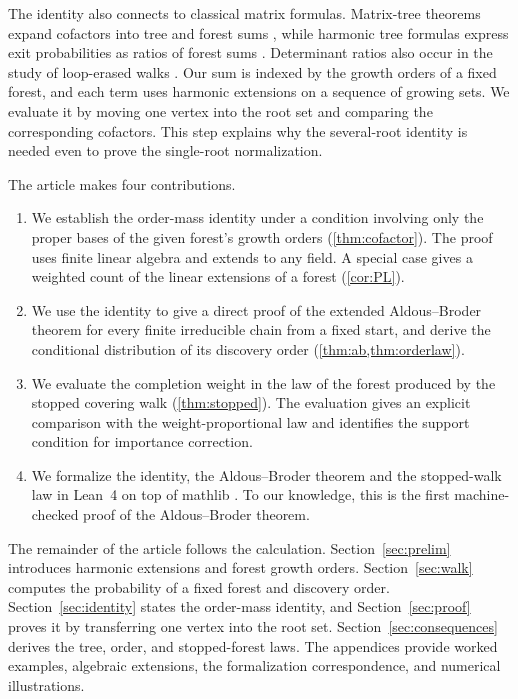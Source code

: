 \documentclass[onefignum,onetabnum,nohypdvips]{siamart250211}
\numberwithin{theorem}{section}
\numberwithin{equation}{section}
\begin{document}
The identity also connects to classical matrix formulas. Matrix-tree
theorems expand cofactors into tree and forest sums
\cite{Tutte1948,Chaiken1982}, while harmonic tree formulas express exit
probabilities as ratios of forest sums \cite{PitmanTang2018}.
Determinant ratios also occur in the study of loop-erased walks
\cite{Marchal2000,Fomin2001}. Our sum is indexed by the growth orders
of a fixed forest, and each term uses harmonic extensions on a
sequence of growing sets. We evaluate it by moving one vertex into
the root set and comparing the corresponding cofactors. This step
explains why the several-root identity is needed even to prove the
single-root normalization.

The article makes four contributions.
\begin{enumerate}
\item We establish the order-mass identity under a condition involving
only the proper bases of the given forest's growth orders
(\cref{thm:cofactor}). The proof uses finite linear algebra and extends
to any field. A special case gives a weighted count of the linear
extensions of a forest (\cref{cor:PL}).
\item We use the identity to give a direct proof of the extended
Aldous--Broder theorem for every finite irreducible chain from a fixed
start, and derive the conditional distribution of its discovery
order (\cref{thm:ab,thm:orderlaw}).
\item We evaluate the completion weight in the law of the forest
produced by the stopped covering walk (\cref{thm:stopped}). The
evaluation gives an explicit comparison with the weight-proportional
law and identifies the support condition for importance correction.
\item We formalize the identity, the Aldous--Broder theorem and the
stopped-walk law in Lean~4 \cite{deMouraUllrich2021} on top of mathlib
\cite{mathlib2020}. To our knowledge, this is the first machine-checked
proof of the Aldous--Broder theorem.
\end{enumerate}

The remainder of the article follows the calculation.
Section~\ref{sec:prelim} introduces harmonic extensions and forest
growth orders. Section~\ref{sec:walk} computes the probability of a
fixed forest and discovery order. Section~\ref{sec:identity} states
the order-mass identity, and Section~\ref{sec:proof} proves it by
transferring one vertex into the root set.
Section~\ref{sec:consequences} derives the tree, order, and
stopped-forest laws. The appendices provide worked examples, algebraic
extensions, the formalization correspondence, and numerical
illustrations.
\end{document}
